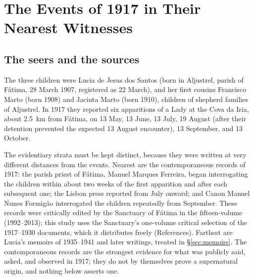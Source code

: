 \section{The Events of 1917 in Their Nearest Witnesses}\label{sec:events}

\subsection{The seers and the sources}

The three children were Lucia de Jesus dos Santos (born in Aljustrel,
parish of F\'atima, 28 March 1907, registered as 22 March), and her
first cousins Francisco Marto (born 1908) and Jacinta Marto (born
1910), children of shepherd families of Aljustrel. In
1917 they reported six apparitions of a Lady at the Cova da Iria,
about 2.5~km from F\'atima, on 13 May, 13 June, 13 July, 19 August
(after their detention prevented the expected 13 August encounter),
13 September, and 13 October.

The evidentiary strata must be kept distinct, because they were
written at very different distances from the events. Nearest are the
contemporaneous records of 1917: the parish priest of F\'atima, Manuel
Marques Ferreira, began interrogating the children within about two
weeks of the first apparition and after each subsequent one; the
Lisbon press reported from July onward; and Canon Manuel Nunes
Formig\~ao interrogated the children repeatedly from September. These
records were critically edited by the Sanctuary of F\'atima in the
fifteen-volume 
(1992--2013); this study uses the Sanctuary's one-volume critical
selection of the 1917--1930 documents, which it distributes freely
(References). Farthest are Lucia's memoirs of 1935--1941 and later
writings, treated in \S\ref{sec:memoirs}. The contemporaneous records are the
strongest evidence for what was publicly said, asked, and observed in
1917; they do not by themselves prove a supernatural origin, and
nothing below asserts one.

